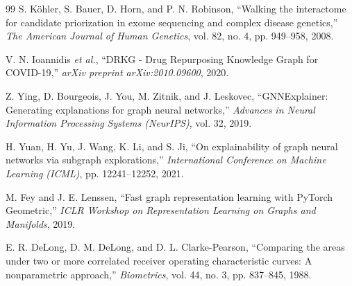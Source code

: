 \documentclass[conference,a4paper]{IEEEtran}
\begin{document}
\begin{thebibliography}{99}
 S. K{\"o}hler, S. Bauer, D. Horn, and P. N. Robinson, 
``Walking the interactome for candidate priorization in exome sequencing and complex disease genetics,''
\textit{The American Journal of Human Genetics}, vol. 82, no. 4, pp. 949--958, 2008.

 V. N. Ioannidis \textit{et al.}, 
``DRKG - Drug Repurposing Knowledge Graph for COVID-19,''
\textit{arXiv preprint arXiv:2010.09600}, 2020.

 Z. Ying, D. Bourgeois, J. You, M. Zitnik, and J. Leskovec, 
``GNNExplainer: Generating explanations for graph neural networks,''
\textit{Advances in Neural Information Processing Systems (NeurIPS)}, vol. 32, 2019.

 H. Yuan, H. Yu, J. Wang, K. Li, and S. Ji, 
``On explainability of graph neural networks via subgraph explorations,''
\textit{International Conference on Machine Learning (ICML)}, pp. 12241--12252, 2021.

 M. Fey and J. E. Lenssen, 
``Fast graph representation learning with PyTorch Geometric,''
\textit{ICLR Workshop on Representation Learning on Graphs and Manifolds}, 2019.

 E. R. DeLong, D. M. DeLong, and D. L. Clarke-Pearson,
``Comparing the areas under two or more correlated receiver operating characteristic curves: A nonparametric approach,''
\textit{Biometrics}, vol. 44, no. 3, pp. 837--845, 1988.

\end{thebibliography}
\end{document}

